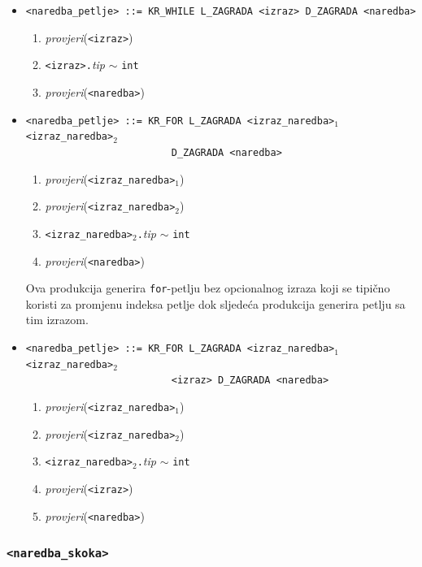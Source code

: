 \documentclass[times, 12pt, utf8]{book}
\begin{document}
\begin{itemize}

\item
\verb|<naredba_petlje> ::= KR_WHILE L_ZAGRADA <izraz> D_ZAGRADA <naredba>|
\begin{enumerate}
\item
\emph{provjeri}(\verb|<izraz>|)
\item
\verb|<izraz>.|\emph{tip} \(\sim\) \verb|int|
\item
\emph{provjeri}(\verb|<naredba>|)
\end{enumerate}

\item
\verb|<naredba_petlje> ::= KR_FOR L_ZAGRADA <izraz_naredba>|\(_1\) \verb|<izraz_naredba>|\(_2\)\\
\verb|                         D_ZAGRADA <naredba>|
\begin{enumerate}
\item
\emph{provjeri}(\verb|<izraz_naredba>|\(_1\))
\item
\emph{provjeri}(\verb|<izraz_naredba>|\(_2\))
\item
\verb|<izraz_naredba>|\(_2\)\verb|.|\emph{tip} \(\sim\) \verb|int|
\item
\emph{provjeri}(\verb|<naredba>|)
\end{enumerate}

Ova produkcija generira \verb|for|-petlju bez opcionalnog izraza koji se tipično koristi za promjenu indeksa petlje dok sljedeća produkcija generira petlju sa tim izrazom.

\item
\verb|<naredba_petlje> ::= KR_FOR L_ZAGRADA <izraz_naredba>|\(_1\) \verb|<izraz_naredba>|\(_2\)\\
\verb|                         <izraz> D_ZAGRADA <naredba>|
\begin{enumerate}
\item
\emph{provjeri}(\verb|<izraz_naredba>|\(_1\))
\item
\emph{provjeri}(\verb|<izraz_naredba>|\(_2\))
\item
\verb|<izraz_naredba>|\(_2\)\verb|.|\emph{tip} \(\sim\) \verb|int|
\item
\emph{provjeri}(\verb|<izraz>|)
\item
\emph{provjeri}(\verb|<naredba>|)
\end{enumerate}

\end{itemize}

\subsubsection{\texttt{<naredba\_skoka>}}
\end{document}
